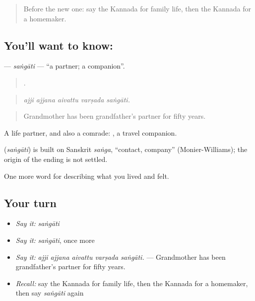 \label{lesson:KA-C523-sangati}



\begin{quote}
Before the new one: say the Kannada for family life, then the Kannada for a homemaker.
\end{quote}

\subsection*{You'll want to know: }
\textbf{} — \emph{saṅgāti} — \textquotedblleft{}a partner; a companion\textquotedblright{}.

\begin{quote}
    .
\end{quote}

\begin{quote}
\emph{ajji ajjana aivattu varṣada saṅgāti.}
\end{quote}

\begin{quote}
Grandmother has been grandfather's partner for fifty years.
\end{quote}

A life partner, and also a comrade:  , a travel companion.

\begin{cousinweb}
\textbf{} (\emph{saṅgāti}) is built on Sanskrit \emph{saṅga}, \textquotedblleft{}contact, company\textquotedblright{} (Monier-Williams); the origin of the ending is not settled.
\end{cousinweb}

\begin{grammarlens}[title={What you've built}]
One more word for describing what you lived and felt.
\end{grammarlens}

\subsection*{Your turn}
\begin{itemize}
\raggedright
  \item \emph{Say it:} \emph{saṅgāti}
  \item \emph{Say it:} \emph{saṅgāti}, once more
  \item \emph{Say it:} \emph{ajji ajjana aivattu varṣada saṅgāti.} — Grandmother has been grandfather's partner for fifty years.
  \item \emph{Recall:} say the Kannada for family life, then the Kannada for a homemaker, then say \emph{saṅgāti} again
\end{itemize}


